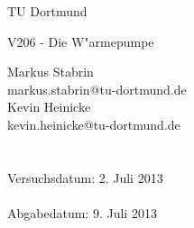 \documentclass[twoside, openany]{scrartcl}
\begin{document}
	
	\vspace*{3cm}

	\begin{center}
		\large
		TU Dortmund
	\end{center}

	\begin{center}
		\Huge
		V206 - Die W"armepumpe
	\end{center}


	\vspace{6cm} %
	\begin{center}
		\begin{minipage}[b]{8cm}
			\Large
			Markus Stabrin \\
			\normalsize
			markus.stabrin@tu-dortmund.de \\

			\Large
			Kevin Heinicke\\
			\normalsize
			kevin.heinicke@tu-dortmund.de \\
			\\
			\\

			Versuchsdatum: 2. Juli 2013 \\
			\\
			Abgabedatum: 9. Juli 2013
		\end{minipage}
	\end{center}

	\thispagestyle{empty}

	\newpage

	

	

	

	
\end{document}
